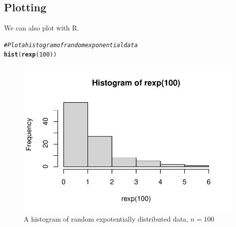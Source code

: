 \documentclass{article}\usepackage[]{graphicx}\usepackage[]{xcolor}
\makeatletter
\def\maxwidth{ %
  \ifdim\Gin@nat@width>\linewidth
    \linewidth
  \else
    \Gin@nat@width
  \fi
}
\newcommand{\hlnum}[1]{\textcolor[rgb]{0.686,0.059,0.569}{#1}}%
\newcommand{\hlcom}[1]{\textcolor[rgb]{0.678,0.584,0.686}{\textit{#1}}}%
\newcommand{\hldef}[1]{\textcolor[rgb]{0.345,0.345,0.345}{#1}}%
\newcommand{\hlkwd}[1]{\textcolor[rgb]{0.737,0.353,0.396}{\textbf{#1}}}%
\newenvironment{kframe}{%
 \def\at@end@of@kframe{}%
 \ifinner\ifhmode%
  \def\at@end@of@kframe{\end{minipage}}%
  \begin{minipage}{\columnwidth}%
 \fi\fi%
 \def\FrameCommand##1{\hskip\@totalleftmargin \hskip-\fboxsep
 \colorbox{shadecolor}{##1}\hskip-\fboxsep
     \hskip-\linewidth \hskip-\@totalleftmargin \hskip\columnwidth}%
 \MakeFramed {\advance\hsize-\width
   \@totalleftmargin\z@ \linewidth\hsize
   \@setminipage}}%
 {\par\unskip\endMakeFramed%
 \at@end@of@kframe}
\newenvironment{knitrout}{}{} %
\makeatother
\begin{document}
\begin{multicols}{2}
\subsection{Plotting}
We can also plot with R.
\begin{knitrout}\scriptsize
{}\color{fgcolor}\begin{kframe}
\begin{alltt}
\hlcom{#Plot a histogram of random exponential data}
\hlkwd{hist}\hldef{(}\hlkwd{rexp}\hldef{(}\hlnum{100}\hldef{))}
\end{alltt}
\end{kframe}
\end{knitrout}
\begin{figure}[H]
  \begin{center}
\begin{knitrout}
\color{fgcolor}
\includegraphics[width=\maxwidth]{figure/unnamed-chunk-6-1} 
\end{knitrout}
  \caption{A histogram of random expotentially distributed data, $n=100$}
  \label{plot1}
  \end{center}
\end{figure}
\columnbreak


\end{multicols}
\end{document}
